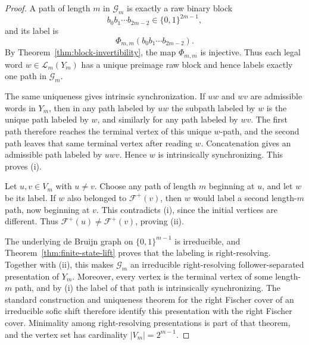 \begin{proof}
A path of length $m$ in $\mathcal G_m$ is exactly a raw binary block
\[
b_0b_1\cdots b_{2m-2}\in\{0,1\}^{2m-1},
\]
and its label is
\[
\Phi_{m,m}(b_0b_1\cdots b_{2m-2}).
\]
By Theorem~\ref{thm:block-invertibility}, the map $\Phi_{m,m}$ is injective.
Thus each legal word $w\in\mathcal L_m(Y_m)$ has a unique preimage raw
block and hence labels exactly one path in $\mathcal G_m$.

The same uniqueness gives intrinsic synchronization. If $uw$ and $wv$ are
admissible words in $Y_m$, then in any path labeled by $uw$ the subpath labeled
by $w$ is the unique path labeled by $w$, and similarly for any path labeled by
$wv$.  The first path therefore reaches the terminal vertex of this unique
$w$-path, and the second path leaves that same terminal vertex after reading
$w$.  Concatenation gives an admissible path labeled by $uwv$.  Hence $w$ is
intrinsically synchronizing.  This proves (i).

Let $u,v\in V_m$ with $u\ne v$.  Choose any path of length $m$ beginning at
$u$, and let $w$ be its label.  If $w$ also belonged to $\mathcal F^+(v)$, then
$w$ would label a second length-$m$ path, now beginning at $v$.  This contradicts
(i), since the initial vertices are different.  Thus
$\mathcal F^+(u)\ne\mathcal F^+(v)$, proving (ii).

The underlying de Bruijn graph on $\{0,1\}^{m-1}$ is irreducible, and
Theorem~\ref{thm:finite-state-lift} proves that the labeling is
right-resolving.  Together with (ii), this makes $\mathcal G_m$ an irreducible
right-resolving follower-separated presentation of $Y_m$. Moreover, every
vertex is the terminal vertex of some length-$m$ path, and by (i) the label of
that path is intrinsically synchronizing.  The standard construction and
uniqueness theorem for the right Fischer cover of an irreducible sofic shift
\cite[Section~3.3]{LindMarcus1995} therefore identify this presentation with
the right Fischer cover.  Minimality among right-resolving presentations is
part of that theorem, and the vertex set has cardinality $|V_m|=2^{m-1}$.
\end{proof}

